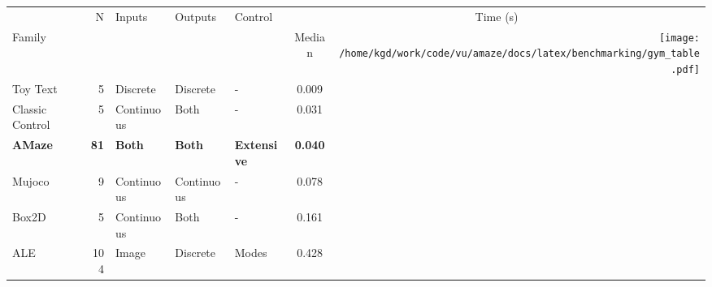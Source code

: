 \documentclass{standalone}
\begin{document}
\newlength{\img}%
\setlength{\img}{7.2\baselineskip}%
\begin{tabular}{lrlllc@{ }r@{}}
\toprule
 &\multirow{2}{*}{ N }&\multirow{2}{*}{ Inputs }&\multirow{2}{*}{ Outputs }&\multirow{2}{*}{ Control }& \multicolumn{2}{c}{Time (s)} \\ 
\cmidrule(lr){6-7}
Family &  &  &  &  & Median & \multirow{7.77}{*}{\texttt{[image: /home/kgd/work/code/vu/amaze/docs/latex/benchmarking/gym\_table.pdf]}} \\
\cmidrule(r){1-6}
Toy Text & 5 & Discrete & Discrete & - & 0.009 \\
Classic Control & 5 & Continuous & Both & - & 0.031 \\
\textbf{AMaze} & \textbf{81} & \textbf{Both} & \textbf{Both} & \textbf{Extensive} & \textbf{0.040 }\\
Mujoco & 9 & Continuous & Continuous & - & 0.078 \\
Box2D & 5 & Continuous & Both & - & 0.161 \\
ALE & 104 & Image & Discrete & Modes & 0.428 \\
\bottomrule
\end{tabular}
\end{document}
